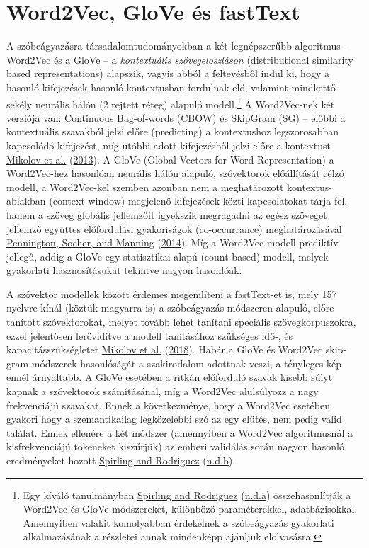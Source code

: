 \documentclass[
]{book}
\begin{document}
\hypertarget{word2vec-glove-uxe9s-fasttext}{%
\section{Word2Vec, GloVe és
fastText}\label{word2vec-glove-uxe9s-fasttext}}

A szóbeágyazásra társadalomtudományokban a két legnépszerűbb algoritmus
-- Word2Vec és a GloVe -- a \emph{kontextuális szövegeloszláson}
(distributional similarity based representations) alapszik, vagyis abból
a feltevésből indul ki, hogy a hasonló kifejezések hasonló kontextusban
fordulnak elő, valamint mindkettő sekély neurális hálón (2 rejtett
réteg) alapuló modell.\footnote{Egy kíváló tanulmányban
  \protect\hyperlink{ref-spirlingword}{Spirling and Rodriguez}
  (\protect\hyperlink{ref-spirlingword}{n.d.a}) összehasonlítják a
  Word2Vec és GloVe módszereket, különbözö paraméterekkel,
  adatbázisokkal. Amennyiben valakit komolyabban érdekelnek a
  szóbeágyazás gyakorlati alkalmazásának a részletei annak mindenképp
  ajánljuk elolvasásra.} A Word2Vec-nek két verziója van: Continuous
Bag-of-words (CBOW) és SkipGram (SG) -- előbbi a kontextuális szavakból
jelzi előre (predicting) a kontextushoz legszorosabban kapcsolódó
kifejezést, míg utóbbi adott kifejezésből jelzi előre a kontextust
\protect\hyperlink{ref-mikolov2013efficient}{Mikolov et al.}
(\protect\hyperlink{ref-mikolov2013efficient}{2013}). A GloVe (Global
Vectors for Word Representation) a Word2Vec-hez hasonlóan neurális hálón
alapuló, szóvektorok előállítását célzó modell, a Word2Vec-kel szemben
azonban nem a meghatározott kontextus-ablakban (context window)
megjelenő kifejezések közti kapcsolatokat tárja fel, hanem a szöveg
globális jellemzőit igyekszik megragadni az egész szöveget jellemző
együttes előfordulási gyakoriságok (co-occurrance) meghatározásával
\protect\hyperlink{ref-pennington2014glove}{Pennington, Socher, and
Manning} (\protect\hyperlink{ref-pennington2014glove}{2014}). Míg a
Word2Vec modell prediktív jellegű, addig a GloVe egy statisztikai alapú
(count-based) modell, melyek gyakorlati hasznosításukat tekintve nagyon
hasonlóak.

A szóvektor modellek között érdemes megemlíteni a fastText-et is, mely
157 nyelvre kínál (köztük magyarra is) a szóbeágyazás módszeren alapuló,
előre tanított szóvektorokat, melyet tovább lehet tanítani speciális
szövegkorpuszokra, ezzel jelentősen lerövidítve a modell tanításához
szükséges idő-, és kapacitásszükségletet
\protect\hyperlink{ref-mikolov2018advances}{Mikolov et al.}
(\protect\hyperlink{ref-mikolov2018advances}{2018}). Habár a GloVe és
Word2Vec skip-gram módszerek hasonlóságát a szakirodalom adottnak veszi,
a tényleges kép ennél árnyaltabb. A GloVe esetében a ritkán előforduló
szavak kisebb súlyt kapnak a szóvektorok számításánal, míg a Word2Vec
alulsúlyozz a nagy frekvenciájú szavakat. Ennek a következménye, hogy a
Word2Vec esetében gyakori hogy a szemantikailag legközelebbi szó az egy
elütés, nem pedig valid találat. Ennek ellenére a két módszer
(amennyiben a Word2Vec algoritmusnál a kisfrekvenciájú tokeneket
kiszűrjük) az emberi validálás során nagyon hasonló eredményeket hozott
\protect\hyperlink{ref-spirlingworda}{Spirling and Rodriguez}
(\protect\hyperlink{ref-spirlingworda}{n.d.b}).
\end{document}
